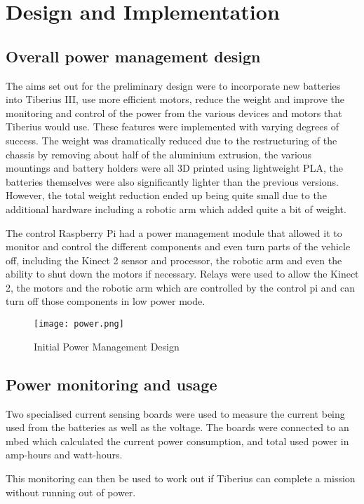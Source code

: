\section{Design and Implementation}

\subsection{Overall power management design}

The aims set out for the preliminary design were to incorporate new batteries into Tiberius III, use more efficient motors, reduce the weight and improve the monitoring and control of the power from the various devices and motors that Tiberius would use.  These features were implemented with varying degrees of success.  
The weight was dramatically reduced due to the restructuring of the chassis by removing about half of the aluminium extrusion, the various mountings and battery holders were all 3D printed using lightweight PLA, the batteries themselves were also significantly lighter than the previous versions.  However, the total weight reduction ended up being quite small due to the additional hardware including a robotic arm which added quite a bit of weight.  

The control Raspberry Pi had a power management module that allowed it to monitor and control the different components and even turn parts of the vehicle off, including the Kinect 2 sensor and processor, the robotic arm and even the ability to shut down the motors if necessary.  
Relays were used to allow the Kinect 2, the motors and the robotic arm which are controlled by the control pi and can turn off those components in low power mode.  

\begin{figure}[!htb]
\begin{center}
\texttt{[image: power.png]}
\end{center}
\caption{Initial Power Management Design}
\label{fig:power}
\end{figure}

\subsection{Power monitoring and usage}
Two specialised current sensing boards were used to measure the current being used from the batteries as well as the voltage. The boards were connected to an mbed which calculated the current power consumption, and total used power in amp-hours and watt-hours.

This monitoring can then be used to work out if Tiberius can complete a mission without running out of power.

